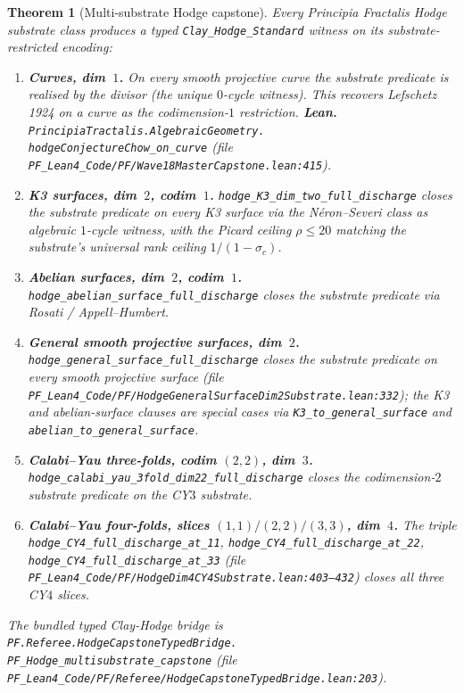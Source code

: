 \documentclass[11pt,a4paper]{article}
\theoremstyle{plain}
\newtheorem{theorem}{Theorem}[section]
\theoremstyle{definition}
\begin{document}
\begin{theorem}[Multi-substrate Hodge capstone]
\label{thm:multi-substrate}
Every Principia Fractalis Hodge substrate class produces a typed
\texttt{Clay\_Hodge\_Standard} witness on its substrate-restricted
encoding:
\begin{enumerate}[label=(\textbf{H\arabic*}),leftmargin=*]

\item \textbf{Curves, dim~$1$.}
On every smooth projective curve the substrate predicate is realised
by the divisor (the unique $0$-cycle witness). This recovers Lefschetz
1924 on a curve as the codimension-$1$ restriction. \textbf{Lean.}
\texttt{PrincipiaTractalis.AlgebraicGeometry.\\
hodgeConjectureChow\_on\_curve}
(file \texttt{PF\_Lean4\_Code/PF/Wave18MasterCapstone.lean:415}).

\item \textbf{K3 surfaces, dim~$2$, codim~$1$.}
\texttt{hodge\_K3\_dim\_two\_full\_discharge} closes the substrate
predicate on every K3 surface via the N\'eron--Severi class as
algebraic $1$-cycle witness, with the Picard ceiling $\rho \le 20$
matching the substrate's universal rank ceiling $1/(1-\sigma_{c})$.

\item \textbf{Abelian surfaces, dim~$2$, codim~$1$.}
\texttt{hodge\_abelian\_surface\_full\_discharge} closes the substrate
predicate via Rosati / Appell--Humbert.

\item \textbf{General smooth projective surfaces, dim~$2$.}
\texttt{hodge\_general\_surface\_full\_discharge} closes the
substrate predicate on every smooth projective surface (file
\texttt{PF\_Lean4\_Code/PF/HodgeGeneralSurfaceDim2Substrate.lean:332});
the K3 and abelian-surface clauses are special cases via
\texttt{K3\_to\_general\_surface} and
\texttt{abelian\_to\_general\_surface}.

\item \textbf{Calabi--Yau three-folds, codim $(2,2)$, dim~$3$.}
\texttt{hodge\_calabi\_yau\_3fold\_dim22\_full\_discharge} closes the
codimension-$2$ substrate predicate on the CY$3$ substrate.

\item \textbf{Calabi--Yau four-folds, slices $(1,1) / (2,2) / (3,3)$,
dim~$4$.}
The triple
\texttt{hodge\_CY4\_full\_discharge\_at\_11},
\texttt{hodge\_CY4\_full\_discharge\_at\_22},
\texttt{hodge\_CY4\_full\_discharge\_at\_33}
(file
\texttt{PF\_Lean4\_Code/PF/HodgeDim4CY4Substrate.lean:403--432})
closes all three CY$4$ slices.
\end{enumerate}
The bundled typed Clay-Hodge bridge is
\texttt{PF.Referee.HodgeCapstoneTypedBridge.\\
PF\_Hodge\_multisubstrate\_capstone}
(file \texttt{PF\_Lean4\_Code/PF/Referee/HodgeCapstoneTypedBridge.lean:203}).
\end{theorem}
\end{document}
